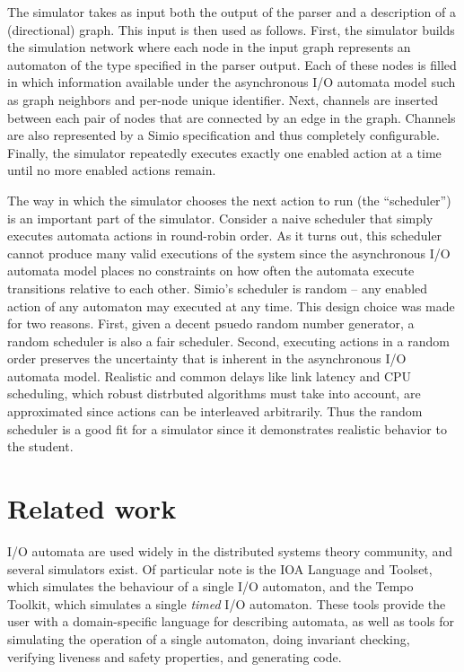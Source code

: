 \documentclass{scrartcl}
\begin{document}
The simulator takes as input both the output of the parser and a description of
a (directional) graph.
This input is then used as follows.
First, the simulator builds the simulation network where each node in the input
graph represents an automaton of the type specified in the parser output.
Each of these nodes is filled in which information available under the
asynchronous I/O automata model such as graph neighbors and per-node unique
identifier.
Next, channels are inserted between each pair of nodes that are connected by an
edge in the graph.
Channels are also represented by a Simio specification and thus completely
configurable.
Finally, the simulator repeatedly executes exactly one enabled action at a time
until no more enabled actions remain.

The way in which the simulator chooses the next action to run (the
``scheduler'') is an important part of the simulator.
Consider a naive scheduler that simply executes automata actions in round-robin
order.
As it turns out, this scheduler cannot produce many valid executions of the
system since the asynchronous I/O automata model places no constraints on how
often the automata execute transitions relative to each other.
Simio's scheduler is random -- any enabled action of any automaton may executed
at any time.
This design choice was made for two reasons.
First, given a decent psuedo random number generator, a random scheduler is
also a fair scheduler.
Second, executing actions in a random order preserves the uncertainty that is
inherent in the asynchronous I/O automata model.
Realistic and common delays like link latency and CPU scheduling, which robust
distrbuted algorithms must take into account, are approximated since actions
can be interleaved arbitrarily.
Thus the random scheduler is a good fit for a simulator since it demonstrates
realistic behavior to the student.

\section{Related work}

I/O automata are used widely in the distributed systems theory community, and
several simulators exist. Of particular note is the IOA Language and
Toolset\cite{ioa}, which simulates the behaviour of a single I/O automaton, and
the Tempo Toolkit\cite{tempo}, which simulates a single \textit{timed} I/O
automaton. These tools provide the user with a domain-specific language for
describing automata, as well as tools for simulating the operation of a single
automaton, doing invariant checking, verifying liveness and safety properties,
and generating code.
\end{document}
